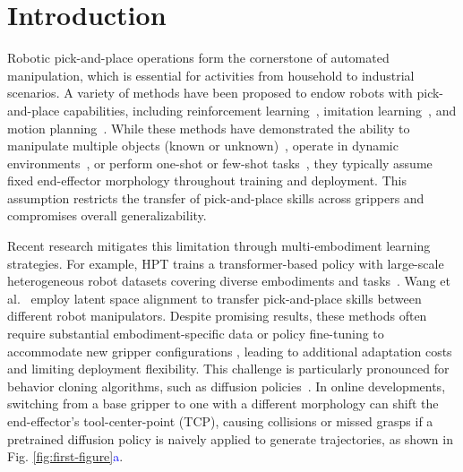 \section{Introduction}

Robotic pick-and-place operations form the cornerstone of automated manipulation, which is essential for activities from household to industrial scenarios. A variety of methods have been proposed to endow robots with pick-and-place capabilities, including reinforcement learning~\cite{10341769,10160626,meng2025preserving}, imitation learning~\cite{10685120}, and motion planning~\cite{migimatsu2020object}. While these methods have demonstrated the ability to manipulate multiple objects (known or unknown)~\cite{9131812,zeng2021transporter}, operate in dynamic environments~\cite{migimatsu2020object}, or perform one-shot or few-shot tasks~\cite{di2023one,10202179}, they typically assume fixed end-effector morphology throughout training and deployment. This assumption restricts the transfer of pick-and-place skills across grippers and compromises overall generalizability.


Recent research mitigates this limitation through multi-embodiment learning strategies. For example, HPT trains a transformer-based policy with large-scale heterogeneous robot datasets covering diverse embodiments and tasks~\cite{wang2024scaling}. Wang et al.~\cite{wang2024cross} employ latent space alignment to transfer pick-and-place skills between different robot manipulators. Despite promising results, these methods often require substantial embodiment-specific data \cite{wang2024scaling} or policy fine-tuning to accommodate new gripper configurations \cite{wang2024scaling,wang2024cross}, leading to additional adaptation costs and limiting deployment flexibility. This challenge is particularly pronounced for behavior cloning algorithms, such as diffusion policies~\cite{chi2023diffusion,Ze2024DP3}. In online developments, switching from a base gripper to one with a different morphology can shift the end-effector’s tool-center-point (TCP), causing collisions or missed grasps if a pretrained diffusion policy is naively applied to generate trajectories, as shown in Fig. \ref{fig:first-figure}\textcolor{blue}{a}.



